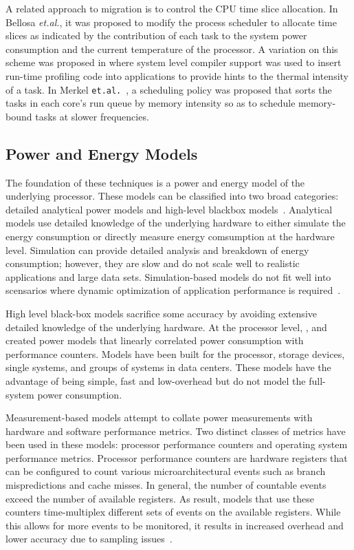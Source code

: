 \documentclass[times,10pt,onecolumn]{article}
\begin{document}
A related approach to migration is to control the CPU time slice
allocation.  In Bellosa \textit{et.al.}\cite{Bellosa2003}, it was
proposed to modify the process scheduler to allocate time slices as
indicated by the contribution of each task to the system power
consumption and the current temperature of the processor. A variation on
this scheme was proposed in \cite{Li2008} where system level compiler
support was used to insert run-time profiling code into applications to
provide hints to the thermal intensity of a task. In Merkel
\texttt{et.al.}~\cite{Merkel2008}, a scheduling policy was proposed
that sorts the tasks in each core's run queue by memory intensity so as
to schedule memory-bound tasks at slower frequencies.

\subsection{Power and Energy Models}
\label{sec:models}

The foundation of these techniques is a power and energy model of the
underlying processor.  These models can be classified into two
broad categories: detailed analytical power models and high-level
blackbox models~\cite{Rivoire2008b}. Analytical models use detailed
knowledge of the underlying hardware to either simulate the energy
consumption or directly measure energy comsumption at the hardware
level.  Simulation can provide detailed analysis and breakdown of energy
consumption; however, they are slow and do not scale well to realistic
applications and large data sets.  Simulation-based models do not fit
well into scensarios where dynamic optimization of application
performance is required~\cite{Economou2006}. 

High level black-box models sacrifice some accuracy by avoiding
extensive detailed knowledge of the underlying hardware.  At the
processor level, \cite{Contreras2005}, and \cite{Bellosa2003} created
power models that linearly correlated power consumption with performance
counters. Models have been built for the processor, storage devices,
single systems, and groups of systems in data centers.  These models
have the advantage of being simple, fast and low-overhead but do not
model the full-system power consumption.

Measurement-based models attempt to collate power measurements with
hardware and software performance metrics.  Two distinct classes of
metrics have been used in these models: processor performance counters
and operating system performance metrics.  Processor performance
counters are hardware registers that can be configured to count various
microarchitectural events such as branch mispredictions and cache
misses.  In general, the number of countable events exceed the number of
available registers.  As result, models that use these counters
time-multiplex different sets of events on the available registers.
While this allows for more events to be monitored, it results in
increased overhead and lower accuracy due to sampling
issues~\cite{Economou2006}\cite{Rivoire2008a}.
\end{document}
